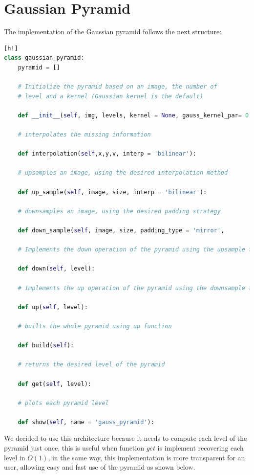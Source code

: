 \section{Gaussian Pyramid}

The implementation of the Gaussian pyramid follows the next structure:

\begin{lstlisting}[language=python][h!]
class gaussian_pyramid:
    pyramid = []
    
    # Initialize the pyramid based on an image, the number of 
    # level and a kernel (Gaussian kernel is the default)
    
    def __init__(self, img, levels, kernel = None, gauss_kernel_par= 0.3):
    
    # interpolates the missing information
    
    def interpolation(self,x,y,v, interp = 'bilinear'):

    # upsamples an image, using the desired interpolation method
    
    def up_sample(self, image, size, interp = 'bilinear'):
    
    # downsamples an image, using the desired padding strategy
    
    def down_sample(self, image, size, padding_type = 'mirror', 

    # Implements the down operation of the pyramid using the upsample function
    
    def down(self, level):

    # Implements the up operation of the pyramid using the downsample function
    
    def up(self, level):
    
    # builts the whole pyramid using up function
    
    def build(self):
    
    # returns the desired level of the pyramid
    
    def get(self, level):
    
    # plots each pyramid level
    
    def show(self, name = 'gauss_pyramid'):
\end{lstlisting}

We decided to use this architecture because it needs to compute each level of the pyramid just once, this is useful when function $get$ is implement recovering each level in $O(1)$, in the same way, this implementation is more transparent for an user, allowing easy and fast use of the pyramid as shown below. 

